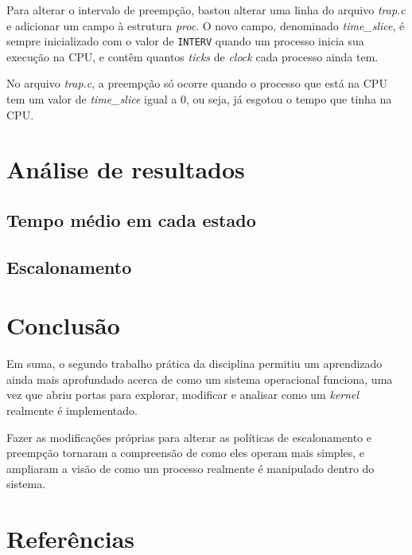 \documentclass{article}
\begin{document}
Para alterar o intervalo de preempção, bastou alterar uma linha do arquivo
\textit{trap.c} e adicionar um campo à estrutura \textit{proc}. O novo campo,
denominado \textit{time\_slice}, é sempre inicializado com o valor de
\texttt{INTERV} quando um processo inicia sua execução na CPU, e contêm quantos
\textit{ticks} de \textit{clock} cada processo ainda tem.

No arquivo \textit{trap.c}, a preempção só ocorre quando o processo que está na
CPU tem um valor de \textit{time\_slice} igual a 0, ou seja, já esgotou o tempo
que tinha na CPU.

\section{Análise de resultados}

\subsection{Tempo médio em cada estado}

\subsection{Escalonamento}

\section{Conclusão}

Em suma, o segundo trabalho prática da disciplina
permitiu um aprendizado ainda mais aprofundado acerca de como um sistema
operacional funciona, uma vez que abriu portas para explorar, modificar e
analisar como um \textit{kernel} realmente é implementado.

Fazer as modificações próprias para alterar as políticas de escalonamento e
preempção tornaram a compreensão de como eles operam mais simples, e ampliaram
a visão de como um processo realmente é manipulado dentro do sistema.

\section{Referências}
\end{document}
